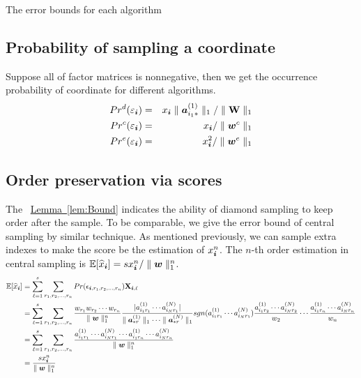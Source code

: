 \documentclass[letterpaper]{article}
\newcommand{\Sca}[3]{{#1}^{(#2)}_{i_#2#3}}%
\newcommand{\V}[1]{{\bm{{\MakeLowercase{#1}}}}}
\newcommand{\Varow}[1]{\V{a}^{(#1)}_{i_#1*}}
\newcommand{\Vacol}[1]{\V{a}^{(#1)}_{*r}}
\newcommand{\M}[1]{{\bm{\mathbf{\MakeUppercase{#1}}}}}
\newcommand{\norm}[2]{\parallel#1\parallel_{#2}}
\newcommand{\Lem}[1] {\hyperref[lem:#1] {Lemma~\ref*{lem:#1}}} %
\begin{document}
The error bounds for each algorithm

\subsection{Probability of sampling a coordinate}

Suppose all of factor matrices is nonnegative, then we get the occurrence probability of coordinate for different algorithms.
\begin{eqnarray}
    \label{eq:ProbabilityDianomd}
    Pr^d(\varepsilon_{\V{i}}) & = & x_\V{i}\norm{\Varow{1}}{1}/\norm{\M{W}}{1}\\
    \label{eq:ProbabilityCentral}
    Pr^c(\varepsilon_{\V{i}}) & = & x_{\V{i}}/\norm{\V{W}^c}{1}\\
    \label{eq:ProbabilityExtensiom}
    Pr^e(\varepsilon_{\V{i}}) & = & x_{\V{i}}^2/\norm{\V{w}^e}{1}
\end{eqnarray}

\subsection{Order preservation via scores}

The ~\Lem{Bound} indicates the ability of diamond sampling to keep order after the sample. To be comparable, we give the error bound of central sampling by similar technique.
As mentioned previously, we can sample extra indexes to make the score be the estimation of $x^n_{\V{i}}$. The $n$-th order estimation in central sampling is $\mathbb{E}[\widehat{x}_{\V{i}}]= sx^n_{\V{i}}/\norm{\V{w}}{1}^n$.
\begin{align*}
\mathbb{E}[\widehat{x}_{\V{i}}]& =\sum_{\ell=1}^{s}\sum_{r_1,r_2,...,r_n} Pr(\epsilon_{\V{i},r_1,r_2,...,r_n})\M{X}_{\V{i},\ell}\\
& = \sum_{\ell=1}^{s}\sum_{r_1,r_2,...,r_n}
\frac{w_{r_1}w_{r_2}\cdots w_{r_n}}{\norm{\V{W}}{1}^n}
\frac{|\Sca{a}{1}{r_1}\cdots\Sca{a}{N}{r_1}|}{\norm{\Vacol{1}}{1}\cdots\norm{\Vacol{N}}{1}}
sgn(\Sca{a}{1}{r_1}\cdots\Sca{a}{N}{r_1})\frac{\Sca{a}{1}{r_2}\cdots\Sca{a}{N}{r_2}}{w_2}\cdots\frac{\Sca{a}{1}{r_n}\cdots\Sca{a}{N}{r_n}}{w_n}
\\
& = \sum_{\ell=1}^{s}\sum_{r_1,r_2,...,r_n} \frac{\Sca{a}{1}{r_1}\cdots\Sca{a}{N}{r_1}\cdots\Sca{a}{1}{r_n}\cdots\Sca{a}{N}{r_n}}{\norm{\V{W}}{1}^n}\\
& = \frac{sx^n_{\V{i}}}{\norm{\V{w}}{1}^n}
\end{align*}
\end{document}
